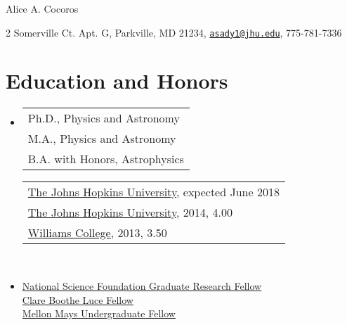 %

\center
{ \huge Alice A. Cocoros}


\vspace{0.10in}

\begin{minipage}{\linewidth}
\center
2 Somerville Ct. Apt. G, Parkville, MD 21234, \href{mailto:asady1@jhu.edu}{\tt asady1@jhu.edu}, 775-781-7336
\end{minipage}

\section*{Education and Honors}

\begin{itemize}
\item
\begin{tabular}[t]{@{}l}
Ph.D., Physics and Astronomy\\
M.A., Physics and Astronomy\\
B.A. with Honors, Astrophysics
\end{tabular}
\hfill
\begin{tabular}[t]{l@{}}
\href{http://physics-astronomy.jhu.edu/}{The Johns Hopkins University}, expected June 2018\\
\href{http://physics-astronomy.jhu.edu/}{The Johns Hopkins University}, 2014, 4.00 \\
\href{http://physics.williams.edu}{Williams College}, 2013, 3.50
\end{tabular}
\\
      \item 
   \href{http://nsfgrfp.org/}{National Science Foundation Graduate Research Fellow} \\
 \href{http://www.hluce.org/cblprogram.aspx}{Clare Boothe Luce Fellow} \\
   \href{http://www.mmuf.org/}{Mellon Mays Undergraduate Fellow} \\
\end{itemize}

